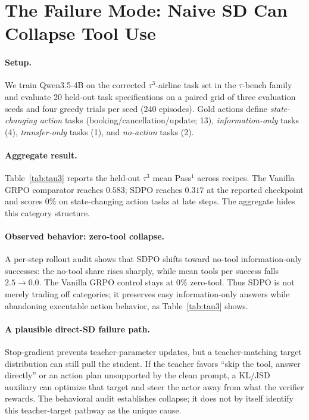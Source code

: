 \section{The Failure Mode: Naive SD Can Collapse Tool Use}
\label{sec:diagnosis}

\paragraph{Setup.} We train Qwen3.5-4B on the corrected $\tau^3$-airline task
set in the $\tau$-bench family
\citep{taubench2024,tau2bench2025,tau3bench2026} and evaluate 20 held-out task
specifications on a paired grid of three evaluation seeds and four greedy trials
per seed (240 episodes). Gold actions define \emph{state-changing action} tasks
(booking/cancellation/update; 13), \emph{information-only} tasks (4),
\emph{transfer-only} tasks (1), and \emph{no-action} tasks (2).

\paragraph{Aggregate result.} Table~\ref{tab:tau3} reports the held-out
$\tau^3$ mean Pass$^1$ across recipes. The Vanilla GRPO comparator reaches $0.583$; SDPO reaches
$0.317$ at the reported checkpoint and scores $0\%$ on state-changing action
tasks at late steps. The aggregate hides this category structure.

\paragraph{Observed behavior: zero-tool collapse.} A per-step rollout audit shows that
SDPO shifts toward no-tool information-only successes: the no-tool share rises
sharply, while mean tools per success falls $2.5\to0.0$. The Vanilla GRPO control
stays at $0\%$ zero-tool. Thus SDPO is not merely
trading off categories; it preserves easy information-only answers while
abandoning executable action behavior, as Table~\ref{tab:tau3} shows.

\paragraph{A plausible direct-SD failure path.} Stop-gradient prevents
teacher-parameter updates, but a teacher-matching target distribution can still
pull the student. If the teacher favors ``skip the tool, answer directly'' or an
action plan unsupported by the clean prompt, a KL/JSD auxiliary can optimize
that target and steer the actor away from what the verifier rewards. The
behavioral audit establishes collapse; it does not by itself identify this
teacher-target pathway as the unique cause.

